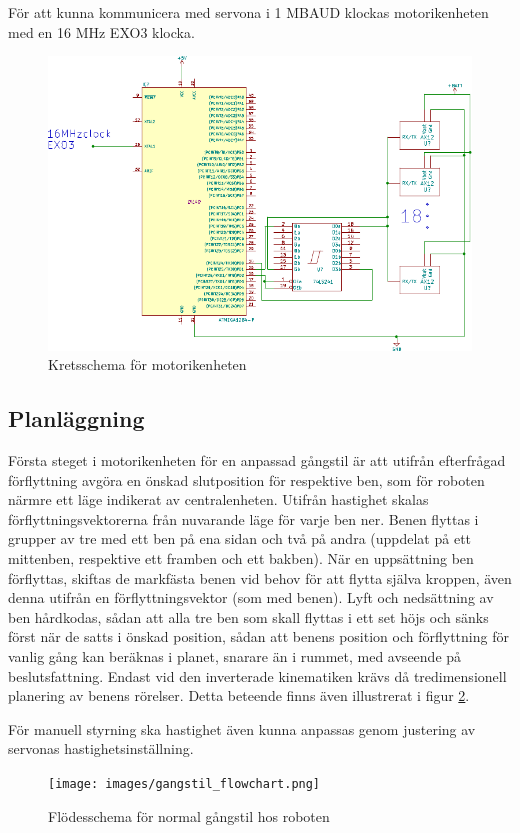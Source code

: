 \documentclass[a4paper,titlepage,12pt]{article}
\begin{document}
	För att kunna kommunicera med servona i 1 MBAUD klockas motorikenheten med en 16 MHz 
	EXO3 klocka.

	\begin{figure}[htpb]
		\centering
		\includegraphics[width=0.6\linewidth]{charts/motor/motorik.pdf}
		\caption{Kretsschema för motorikenheten}
		\label{fig:motorik}
	\end{figure}
	
		\subsection{Planläggning}
	Första steget i motorikenheten för en anpassad gångstil är att utifrån efterfrågad
	förflyttning avgöra en önskad slutposition för respektive ben, som för roboten närmre 
	ett läge indikerat av centralenheten. Utifrån hastighet skalas förflyttningsvektorerna 
	från nuvarande läge för varje ben ner. Benen flyttas i grupper av tre med ett ben på 
	ena sidan och två på  andra (uppdelat på ett mittenben, respektive ett framben och ett 
	bakben). När en uppsättning ben förflyttas, skiftas de markfästa benen vid behov för 
	att flytta själva kroppen, även denna utifrån en förflyttningsvektor (som med benen). 
	Lyft och nedsättning av ben hårdkodas, sådan att alla tre ben som skall flyttas i ett 
	set höjs och sänks först när de satts i önskad position, sådan att benens position 
	och förflyttning för vanlig gång kan beräknas i planet, snarare än i rummet, med 
	avseende på beslutsfattning. Endast vid den inverterade kinematiken krävs då 
	tredimensionell planering av benens rörelser. Detta beteende finns även illustrerat i 
	figur \ref{fig:walkflow0}. 
	
	För manuell styrning ska hastighet även kunna anpassas genom justering av servonas
	hastighetsinställning.

	\begin{figure}[h]
		\centering
		\texttt{[image: images/gangstil\_flowchart.png]}
		\caption{Flödesschema för normal gångstil hos roboten \label{fig:walkflow0}}
	\end{figure}
\end{document}
